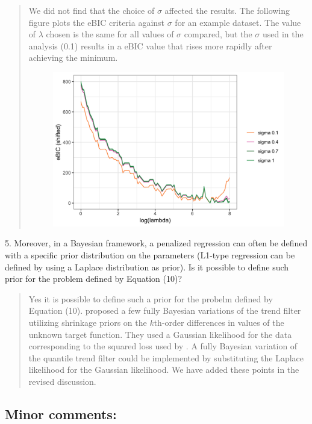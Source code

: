 \documentclass{article}
\begin{document}
\begin{quote}
We did not find that the choice of $\sigma$ affected the results. The following figure plots the eBIC criteria against $\sigma$ for an example dataset. The value of $\lambda$ chosen is the same for all values of $\sigma$ compared, but the $\sigma$ used in the analysis (0.1) results in a eBIC value that rises more rapidly after achieving the minimum. 

\begin{figure}[h!]
\centering
\includegraphics[width = 0.7\linewidth]{BIC_by_lambda_and_sigma.png}
\end{figure}
\end{quote}

5. Moreover, in a Bayesian framework, a penalized regression can often be defined with a specific prior distribution on the parameters (L1-type regression can be defined by using a Laplace distribution as prior). Is it possible to define such prior for the problem defined by Equation (10)?

\begin{quote}
Yes it is possible to define such a prior for the probelm defined by Equation (10). \cite{faulkner2018locally} proposed a few fully Bayesian variations of the trend filter utilizing shrinkage priors on the $k$th-order differences in values of the unknown target function. They used a Gaussian likelihood for the data corresponding to the squared loss used by \cite{Kim2009}. A fully Bayesian variation of the quantile trend filter could be implemented by substituting the Laplace likelihood for the Gaussian likelihood. %
We have added these points in the revised discussion.
\end{quote}

\subsection*{Minor comments:}
\end{document}
